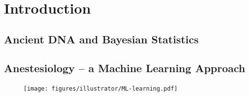 
\chapter{Introduction}
% 


\section{Ancient DNA and Bayesian Statistics}
\label{section:ancientDNA}
% 


\section{Anestesiology -- a Machine Learning Approach }
\label{section:machine-learning}

\begin{figure}[htbp]
    \centering
    \texttt{[image: figures/illustrator/ML-learning.pdf]}
\end{figure}



